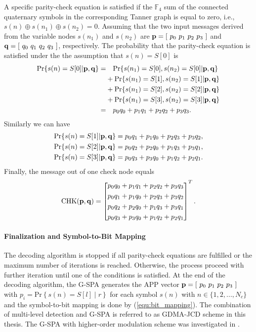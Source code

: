 A specific parity-check equation is satisfied if the $\mathbb{F}_4$ sum of the connected quaternary symbols in the corresponding Tanner graph is equal to zero, i.e., $s(n) \oplus s(n_1) \oplus s(n_2) = 0$. Assuming that the two input messages derived from the variable nodes $s(n_1)$ and $s(n_2)$ are ${\bf p} = [ \ p_0 \ p_1 \ p_2 \ p_3 \ ]$ and ${\bf q} = [ \ q_0 \ q_1 \ q_2 \ q_3 \ ]$, respectively. The probability that the parity-check equation is satisfied under the the assumption that $s(n)=S[0]$ is
\begin{align}
 \text{Pr}\{s(n)=S[0]|{\bf p}, {\bf q}\} = & \quad \text{Pr}\{s(n_1)=S[0], s(n_2)=S[0]|{\bf p}, {\bf q}\} \nonumber \\
 & + \text{Pr}\{s(n_1)=S[1], s(n_2)=S[1]|{\bf p}, {\bf q}\} \nonumber \\
 & + \text{Pr}\{s(n_1)=S[2], s(n_2)=S[2]|{\bf p}, {\bf q}\} \nonumber \\
 & + \text{Pr}\{s(n_1)=S[3], s(n_2)=S[3]|{\bf p}, {\bf q}\} \nonumber \\
 = & \quad p_0 q_0 + p_1 q_1 + p_2 q_2 + p_3 q_3.
\end{align}
Similarly we can have
\begin{align}
 \text{Pr}\{s(n)=S[1]|{\bf p}, {\bf q}\} & = p_0 q_1 + p_1 q_0 + p_2 q_3 + p_3 q_2, \nonumber \\
 \text{Pr}\{s(n)=S[2]|{\bf p}, {\bf q}\} & = p_0 q_2 + p_2 q_0 + p_1 q_3 + p_3 q_1, \nonumber \\
 \text{Pr}\{s(n)=S[3]|{\bf p}, {\bf q}\} & = p_0 q_3 + p_3 q_0 + p_1 q_2 + p_2 q_1.
\end{align}
Finally, the message out of one check node equals
\begin{equation}
 \text{CHK}({\bf p},{\bf q})= \left[
 \begin{split}
  &p_0 q_0 + p_1 q_1 + p_2 q_2 + p_3 q_3 \\
  &p_0 q_1 + p_1 q_0 + p_2 q_3 + p_3 q_2 \\
  &p_0 q_2 + p_2 q_0 + p_1 q_3 + p_3 q_1 \\
  &p_0 q_3 + p_3 q_0 + p_1 q_2 + p_2 q_1
 \end{split}
 \right]^T.
\end{equation}

\paragraph{Finalization and Symbol-to-Bit Mapping}

The decoding algorithm is stopped if all parity-check equations are fulfilled or the maximum number of iterations is reached. Otherwise, the process proceed with further iteration until one of the conditions is satisfied. At the end of the decoding algorithm, the G-SPA generates the APP vector ${\bf p} = [ \ p_0 \ p_1 \ p_2 \ p_3 \ ]$  with $p_i = \text{Pr}\left\{s(n) = S[l]\middle|r\right\}$ for each symbol $s(n)$ with $n \in \{1, 2, ..., N_c\}$ and the symbol-to-bit mapping is done by (\ref{equ:bit_mapping}). The combination of multi-level detection and G-SPA is referred to as GDMA-JCD scheme in this thesis. The G-SPA with higher-order modulation scheme was investigated in \cite{gjcncqpsk10}. 


